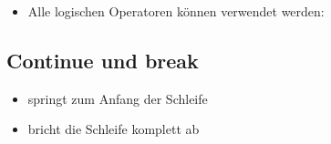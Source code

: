 \begin{frame}
	\begin{itemize}
		\item Alle logischen Operatoren können verwendet werden:
	\end{itemize}
\end{frame}

\subsection{Continue und break}
\begin{frame}
	\slidehead

	\begin{itemize}
		\item {} springt zum Anfang der Schleife
		\item {} bricht die Schleife komplett ab
	\end{itemize}
\end{frame}



